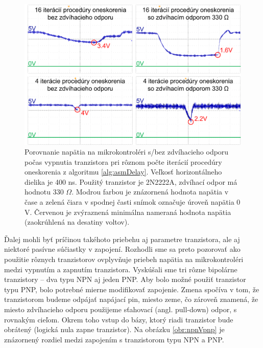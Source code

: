 \begin{figure}
    \centerline{\includegraphics[width=1\textwidth]{images/vccAnalysis.png}}
    \caption[Porovnanie napätia na mikrokontroléri s/bez zdvíhacieho odporu]{Porovnanie napätia na mikrokontroléri s/bez zdvíhacieho odporu počas vypnutia tranzistora pri rôznom počte iterácií procedúry oneskorenia z algoritmu \ref{alg:asmDelay}. Veľkosť horizontálneho dielika je 400 ns. Použitý tranzistor je 2N2222A, zdvíhací odpor má hodnotu 330 $\Omega$. Modrou farbou je znázornená hodnota napätia v čase a zelená čiara v spodnej časti snímok označuje úroveň napätia 0 V. Červenou je zvýraznená minimálna nameraná hodnota napätia (zaokrúhlená na desatiny voltov).}
    \label{obr:vccAnalysis}
\end{figure}

Ďalej mohli byť príčinou takéhoto priebehu aj parametre tranzistora, ale aj niektoré pasívne súčiastky v zapojení. Rozhodli sme sa preto pozorovať ako použitie rôznych tranzistorov ovplyvňuje priebeh napätia na mikrokontroléri medzi vypnutím a zapnutím tranzistora. Vyskúšali sme tri rôzne bipolárne tranzistory -- dva typu NPN aj jeden PNP. Aby bolo možné použiť tranzistor typu PNP, bolo potrebné mierne modifikovať zapojenie. Zmena spočíva v tom, že tranzistorom budeme odpájať napájací pin, miesto zeme, čo zároveň znamená, že miesto zdvíhacieho odporu použijeme sťahovací (angl. pull-down) odpor, s rovnakým cieľom. Okrem toho vstup do bázy, ktorý riadi tranzistor bude obrátený (logická nula zapne tranzistor). Na obrázku \ref{obr:npnVpnp} je znázornený rozdiel medzi zapojením s tranzistorom typu NPN a PNP.

